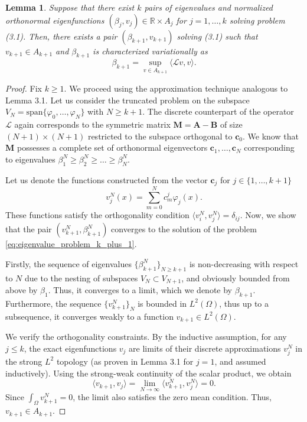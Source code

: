 \documentclass[11pt, a4paper]{article}
\theoremstyle{break}
\theoremstyle{break}
\theoremstyle{break}
\theoremstyle{break}
\theoremstyle{break}
\newtheorem{lem}{Lemma}[section]
\theoremstyle{break}
\theoremstyle{break}
\theoremstyle{break}
\theoremstyle{break}
\begin{document}
\begin{lem}
    \label{lem:inductive_step}
    Suppose that there exist $k$ pairs of eigenvalues and normalized orthonormal eigenfunctions $(\beta_j, v_j) \in \mathbb{R} \times A_j$ for $j=1, \ldots, k$ solving problem (3.1). Then, there exists a pair $(\beta_{k+1}, v_{k+1})$ solving (3.1) such that $v_{k+1} \in A_{k+1}$ and $\beta_{k+1}$ is characterized variationally as
    \begin{equation}
        \label{eq:eigenvalue_problem_k_plus_1}
        \beta_{k+1} = \sup_{v \in A_{k+1}} \langle \mathcal{L} v, v \rangle.
    \end{equation}
\end{lem}

\begin{proof}
    Fix $k \geq 1$. We proceed using the approximation technique analogous to Lemma 3.1. Let us consider the truncated problem on the subspace $V_N = \text{span}\{\varphi_0, \ldots, \varphi_N\}$ with $N \geq k+1$. The discrete counterpart of the operator $\mathcal{L}$ again corresponds to the symmetric matrix $\mathbf{M} = \mathbf{A} - \mathbf{B}$ of size $(N+1) \times (N+1)$ restricted to the subspace orthogonal to $\mathbf{c}_0$. We know that $\mathbf{M}$ possesses a complete set of orthonormal eigenvectors $\mathbf{c}_1, \ldots, \mathbf{c}_N$ corresponding to eigenvalues $\beta_1^N \geq \beta_2^N \geq \ldots \geq \beta_N^N$. 
    
    Let us denote the functions constructed from the vector $\mathbf{c}_j$ for $j \in \{1, \ldots, k+1\}$
    \begin{equation}
        v_j^N(x) = \sum_{m=0}^N c^j_m \varphi_j(x).
    \end{equation}
    These functions satisfy the orthogonality condition $\langle v_i^N, v_j^N \rangle = \delta_{ij}$. Now, we show that the pair $(v_{k+1}^N, \beta_{k+1}^N)$ converges to the solution of the problem \eqref{eq:eigenvalue_problem_k_plus_1}.
    
    Firstly, the sequence of eigenvalues $\{\beta_{k+1}^N\}_{N \geq k+1}$ is non-decreasing with respect to $N$ due to the nesting of subspaces $V_N \subset V_{N+1}$, and obviously bounded from above by $\beta_1$. Thus, it converges to a limit, which we denote by $\beta_{k+1}$. Furthermore, the sequence $\{v_{k+1}^N\}_{N}$ is bounded in $L^2(\Omega)$, thus up to a subsequence, it converges weakly to a function $v_{k+1} \in L^2(\Omega)$.
    
    We verify the orthogonality constraints. By the inductive assumption, for any $j \leq k$, the exact eigenfunctions $v_j$ are limits of their discrete approximations $v_j^N$ in the strong $L^2$ topology (as proven in Lemma 3.1 for $j=1$, and assumed inductively). Using the strong-weak continuity of the scalar product, we obtain
    \begin{equation}
        \langle v_{k+1}, v_j \rangle = \lim_{N \to \infty} \langle v_{k+1}^N, v_j^N \rangle = 0.
    \end{equation}
    Since $\int_\Omega v_{k+1}^N = 0$, the limit also satisfies the zero mean condition. Thus, $v_{k+1} \in A_{k+1}$.
    

\end{proof}
\end{document}
